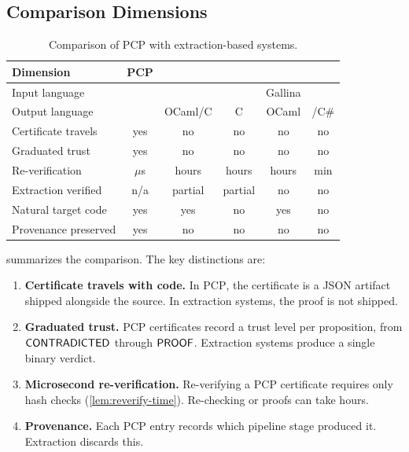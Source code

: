 \documentclass[11pt]{article}
\newcommand{\pcp}{\textsc{PCP}}           %
\begin{document}
\subsection{Comparison Dimensions}

\begin{table}[t]
\centering
\caption{Comparison of \pcp{} with extraction-based systems.}
\label{tab:extraction-comparison}
\small
\begin{tabular}{@{}lccccc@{}}
\toprule
\textbf{Dimension} & \textbf{\pcp{}} & \textbf{\Fstar{}} &
\textbf{\LEAN{}} & \textbf{\Coq{}} & \textbf{\Dafny{}} \\
\midrule
Input language & \Python{} & \Fstar{} & \LEAN{} & Gallina & \Dafny{} \\
Output language & \Python{} & OCaml/C & C & OCaml & \Python{}/C\# \\
Certificate travels & yes & no & no & no & no \\
Graduated trust & yes & no & no & no & no \\
Re-verification & $\mu$s & hours & hours & hours & min \\
Extraction verified & n/a & partial & partial & no & no \\
Natural target code & yes & yes & no & yes & no \\
Provenance preserved & yes & no & no & no & no \\
\bottomrule
\end{tabular}
\end{table}

 summarizes the comparison.  The
key distinctions are:
\begin{enumerate}
  \item \textbf{Certificate travels with code.}  In \pcp{}, the
    certificate is a JSON artifact shipped alongside the \Python{}
    source.  In extraction systems, the proof is not shipped.

  \item \textbf{Graduated trust.}  \pcp{} certificates record a
    trust level per proposition, from $\mathsf{CONTRADICTED}$ through $\mathsf{PROOF}$.
    Extraction systems produce a single binary verdict.

  \item \textbf{Microsecond re-verification.}  Re-verifying a
    \pcp{} certificate requires only hash checks (\cref{lem:reverify-time}).
    Re-checking \Fstar{} or \Coq{} proofs can take hours.

  \item \textbf{Provenance.}  Each \pcp{} entry records which
    pipeline stage produced it.  Extraction discards this.
\end{enumerate}
\end{document}
